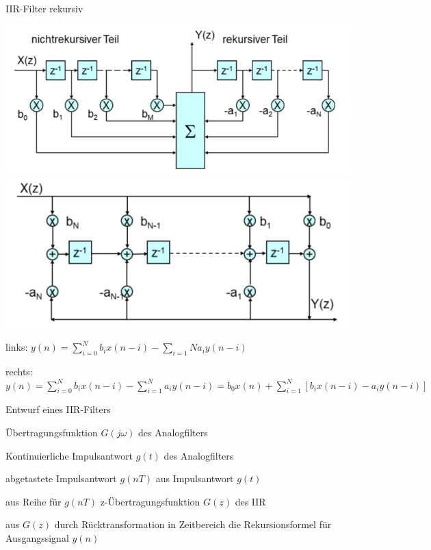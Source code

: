 \documentclass[a4paper]{article}
\begin{document}
\begin{multicols}{3}
  IIR-Filter rekursiv
  \begin{center}
    \includegraphics[width=.4\linewidth]{Assets/Biosignalverarbeitung-iir-rekursiv.png}
    \includegraphics[width=.4\linewidth]{Assets/Biosignalverarbeitung-iir-rekursiv-2.png}
  \end{center}
  \begin{itemize*}
    \item links: $y(n)=\sum_{i=0}^{N} b_ix(n-i) - \sum_{i=1}{N} a_iy(n-i)$
    \item rechts: $y(n)=\sum_{i=0}^N b_ix(n-i) - \sum_{i=1}^N a_iy(n-i) = b_0x(n)+ \sum_{i=1}^N [b_ix(n-i) - a_iy(n-i)]$
  \end{itemize*}

  Entwurf eines IIR-Filters
  \begin{enumerate*}
    \item Übertragungsfunktion $G(j\omega)$ des Analogfilters
    \item Kontinuierliche Impulsantwort $g(t)$ des Analogfilters
    \item abgetastete Impulsantwort $g(nT)$ aus Impulsantwort $g(t)$
    \item aus Reihe für $g(nT)$ z-Übertragungsfunktion $G(z)$ des IIR
    \item aus $G(z)$ durch Rücktransformation in Zeitbereich die Rekursionsformel für Ausgangssignal $y(n)$
  \end{enumerate*}


\end{multicols}
\end{document}
